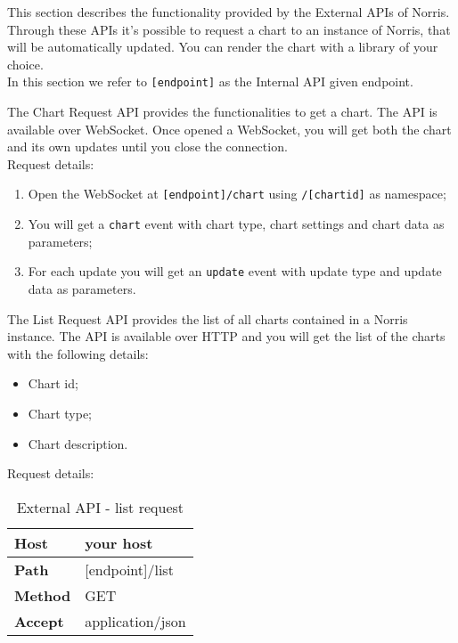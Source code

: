  \label{sec:ExternalAPI}
    This section describes the functionality provided by the External APIs of Norris. Through these APIs it's possible to request a chart to an instance of Norris, that will be automatically updated. You can render the chart with a library of your choice.\\
    In this section we refer to \texttt{[endpoint]} as the Internal API given endpoint.

        The Chart Request API provides the functionalities to get a chart. The API is available over WebSocket. Once opened a WebSocket, you will get both the chart and its own updates until you close the connection. \\
        Request details:
        \begin{enumerate}
            \item Open the WebSocket at \texttt{[endpoint]/chart} using \texttt{/[chartid]} as namespace;
            \item You will get a \texttt{chart} event with chart type, chart settings and chart data as parameters;
            \item For each update you will get an \texttt{update} event with update type and update data as parameters.
        \end{enumerate}

        The List Request API provides the list of all charts contained in a Norris instance. The API is available over HTTP and you will get the list of the charts with the following details:
        \begin{itemize}
            \item Chart id;
            \item Chart type;
            \item Chart description.
        \end{itemize}
        Request details:
        \begin{table}[H]
            \centering
            \begin{tabu}{|l|l|}
                \hline
                \textbf{Host} & your host \\ \hline
                \textbf{Path} & [endpoint]/list \\ \hline
                \textbf{Method} & GET \\ \hline
                \textbf{Accept} & application/json \\ \hline
            \end{tabu}
            \caption{External API - list request}
        \end{table}

